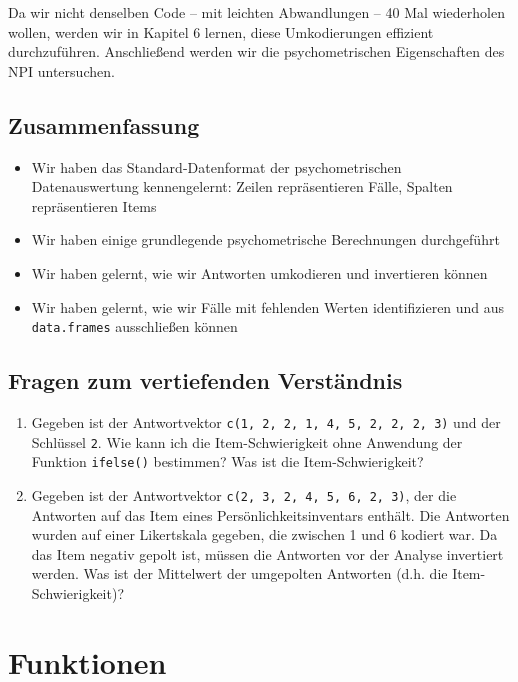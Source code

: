 \documentclass[12pt,]{tufte-book}
\providecommand{\tightlist}{%
  \setlength{\itemsep}{0pt}\setlength{\parskip}{0pt}}
\theoremstyle{definition}
\theoremstyle{definition}
\theoremstyle{definition}
\theoremstyle{remark}
\begin{document}
Da wir nicht denselben Code -- mit leichten Abwandlungen -- 40 Mal
wiederholen wollen, werden wir in Kapitel 6 lernen, diese Umkodierungen
effizient durchzuführen. Anschließend werden wir die psychometrischen
Eigenschaften des NPI untersuchen.

\section{Zusammenfassung}\label{zusammenfassung-2}

\begin{itemize}
\tightlist
\item
  Wir haben das Standard-Datenformat der psychometrischen
  Datenauswertung kennengelernt: Zeilen repräsentieren Fälle, Spalten
  repräsentieren Items
\item
  Wir haben einige grundlegende psychometrische Berechnungen
  durchgeführt
\item
  Wir haben gelernt, wie wir Antworten umkodieren und invertieren können
\item
  Wir haben gelernt, wie wir Fälle mit fehlenden Werten identifizieren
  und aus \texttt{data.frames} ausschließen können
\end{itemize}

\section{Fragen zum vertiefenden
Verständnis}\label{fragen-zum-vertiefenden-verstuxe4ndnis-2}

\begin{enumerate}
\def\labelenumi{\arabic{enumi}.}
\item
  Gegeben ist der Antwortvektor
  \texttt{c(1,\ 2,\ 2,\ 1,\ 4,\ 5,\ 2,\ 2,\ 2,\ 3)} und der Schlüssel
  \texttt{2}. Wie kann ich die Item-Schwierigkeit ohne Anwendung der
  Funktion \texttt{ifelse()} bestimmen? Was ist die Item-Schwierigkeit?
\item
  Gegeben ist der Antwortvektor
  \texttt{c(2,\ 3,\ 2,\ 4,\ 5,\ 6,\ 2,\ 3)}, der die Antworten auf das
  Item eines Persönlichkeitsinventars enthält. Die Antworten wurden auf
  einer Likertskala gegeben, die zwischen 1 und 6 kodiert war. Da das
  Item negativ gepolt ist, müssen die Antworten vor der Analyse
  invertiert werden. Was ist der Mittelwert der umgepolten Antworten
  (d.h. die Item-Schwierigkeit)?
\end{enumerate}

\chapter{Funktionen}\label{funktionen}
\end{document}
